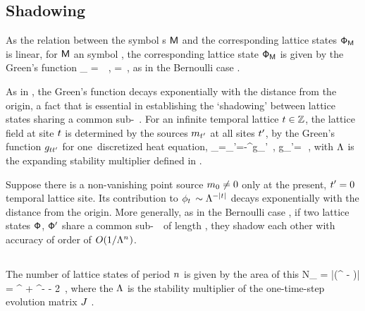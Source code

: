 \subsection{Shadowing}
\label{s:tempCatShadow}

As the
relation between the symbol {\brick}s $\mathsf{M}$  and the corresponding
lattice states $\mathsf{\Phi}_{\mathsf{M}}$ is linear, for $\mathsf{M}$ an {\admissible} symbol
\brick, the corresponding lattice state $\mathsf{\Phi}_{\mathsf{M}}$ is given by
the Green's function
\beq
\Xx_\Mm
= \gd\,\Mm
\,,\qquad
\gd = 
\,,
as in the Bernoulli case .

As in , the Green's function 
decays exponentially  with the distance from the origin, a fact that is
essential in establishing the `shadowing' between lattice states sharing
a common sub-\brick\ \Mm. For an infinite temporal lattice
$t\in\mathbb{Z}$, the lattice field at site $t$ is determined by
the sources ${m_{t'}}$ at all sites ${t'}$, by the  Green's function
$g_{tt'}$ for one\dmn\ discretized heat
equation,
\beq
  \ssp_{\zeit}=\sum_{\zeit'=-\infty}^\infty g_{\zeit\zeit'} 
\,, \qquad
g_{\zeit\zeit'}=\,
\,,
with $\Lambda$ is the expanding stability
multiplier defined in .

Suppose there is a non-vanishing point source ${m_{0}}\neq0$ only at the
present, $t'=0$ temporal lattice site. Its contribution to
$\phi_{t}$ $\sim \Lambda^{-|t|}$ decays exponentially  with the
distance from the origin. More generally, as in the Bernoulli case
, if two lattice states $\mathsf{\Phi}$, $\mathsf{\Phi}'$ share a common
sub-\brick\ \Mm\ of length \cl{}, they shadow each other with accuracy of
order of $O(1/\Lambda^{{n_{}}})$.

\subsection{\Tzeta}
\label{s:tempCatZeta}

The number of lattice states of period ${n_{}}$ is
given by the area of this {\fundPip}
\beq
N_{\cl{}} = |\det(\jMps^{\cl{}} - \matId)|
          = \ExpaEig^{\cl{}} + \ExpaEig^{-\cl{}} - 2
\,,
where the $\Lambda$ is the stability multiplier  of the
one-time-step evolution matrix $J$ .

